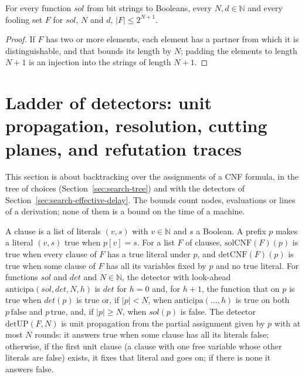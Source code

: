 \begin{theorem}
  \label{thm:search-curva-le-lineal}
  \leanok
  For every function $\mathit{sol}$ from bit strings to Booleans, every $N, d \in \mathbb{N}$ and
  every fooling set $F$ for $\mathit{sol}$, $N$ and $d$, $|F| \le 2^{N+1}$.
  \own{}
\end{theorem}

\begin{proof}
  \leanok
  If $F$ has two or more elements, each element has a partner from which it is distinguishable, and
  that bounds its length by $N$; padding the elements to length $N+1$ is an injection into the
  strings of length $N+1$.
\end{proof}

\section{Ladder of detectors: unit propagation, resolution, cutting planes, and refutation traces}
\label{sec:search-ladder}

This section is about backtracking over the assignments of a CNF formula, in the tree of choices
(Section~\ref{sec:search-tree}) and with the detectors of Section~\ref{sec:search-effective-delay}.
The bounds count nodes, evaluations or lines of a derivation; none of them is a bound on the time
of a machine.

\begin{definition}
  \label{def:search-cnf-detectors}
  \leanok
  A clause is a list of literals $(v, s)$ with $v \in \mathbb{N}$ and $s$ a Boolean. A prefix $p$
  makes a literal $(v, s)$ true when $p[v] = s$. For a list $F$ of clauses, $\mathrm{solCNF}(F)(p)$
  is true when every clause of $F$ has a true literal under $p$, and $\mathrm{detCNF}(F)(p)$ is true
  when some clause of $F$ has all its variables fixed by $p$ and no true literal. For functions
  $\mathit{sol}$ and $\mathit{det}$ and $N \in \mathbb{N}$, the detector with look-ahead
  $\mathrm{anticipa}(\mathit{sol}, \mathit{det}, N, h)$ is $\mathit{det}$ for $h = 0$ and, for
  $h + 1$, the function that on $p$ is true when $\mathit{det}(p)$ is true or, if $|p| < N$, when
  $\mathrm{anticipa}(\dots, h)$ is true on both $p\,\mathrm{false}$ and $p\,\mathrm{true}$, and, if
  $|p| \ge N$, when $\mathit{sol}(p)$ is false. The detector $\mathrm{detUP}(F, N)$ is unit
  propagation from the partial assignment given by $p$ with at most $N$ rounds: it answers true when
  some clause has all its literals false; otherwise, if the first unit clause (a clause with one
  free variable whose other literals are false) exists, it fixes that literal and goes on; if
  there is none it answers false.
  \own{}
\end{definition}

